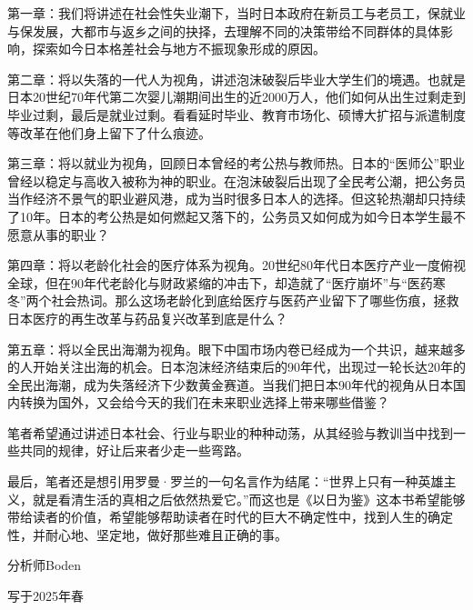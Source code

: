 第一章：我们将讲述在社会性失业潮下，当时日本政府在新员工与老员工，保就业与保发展，大都市与返乡之间的抉择，去理解不同的决策带给不同群体的具体影响，探索如今日本格差社会与地方不振现象形成的原因。

第二章：将以失落的一代人为视角，讲述泡沫破裂后毕业大学生们的境遇。也就是日本20世纪70年代第二次婴儿潮期间出生的近2000万人，他们如何从出生过剩走到毕业过剩，最后是就业过剩。看看延时毕业、教育市场化、硕博大扩招与派遣制度等改革在他们身上留下了什么痕迹。

第三章：将以就业为视角，回顾日本曾经的考公热与教师热。日本的“医师公”职业曾经以稳定与高收入被称为神的职业。在泡沫破裂后出现了全民考公潮，把公务员当作经济不景气的职业避风港，成为当时很多日本人的选择。但这轮热潮却只持续了10年。日本的考公热是如何燃起又落下的，公务员又如何成为如今日本学生最不愿意从事的职业？

第四章：将以老龄化社会的医疗体系为视角。20世纪80年代日本医疗产业一度俯视全球，但在90年代老龄化与财政紧缩的冲击下，却造就了“医疗崩坏”与“医药寒冬”两个社会热词。那么这场老龄化到底给医疗与医药产业留下了哪些伤痕，拯救日本医疗的再生改革与药品复兴改革到底是什么？

第五章：将以全民出海潮为视角。眼下中国市场内卷已经成为一个共识，越来越多的人开始关注出海的机会。日本泡沫经济结束后的90年代，出现过一轮长达20年的全民出海潮，成为失落经济下少数黄金赛道。当我们把日本90年代的视角从日本国内转换为国外，又会给今天的我们在未来职业选择上带来哪些借鉴？

笔者希望通过讲述日本社会、行业与职业的种种动荡，从其经验与教训当中找到一些共同的规律，好让后来者少走一些弯路。

最后，笔者还是想引用罗曼·罗兰的一句名言作为结尾：“世界上只有一种英雄主义，就是看清生活的真相之后依然热爱它。”而这也是《以日为鉴》这本书希望能够带给读者的价值，希望能够帮助读者在时代的巨大不确定性中，找到人生的确定性，并耐心地、坚定地，做好那些难且正确的事。

{\kaishu\hfill 分析师Boden\par}

{\kaishu\hfill 写于2025年春\par}
